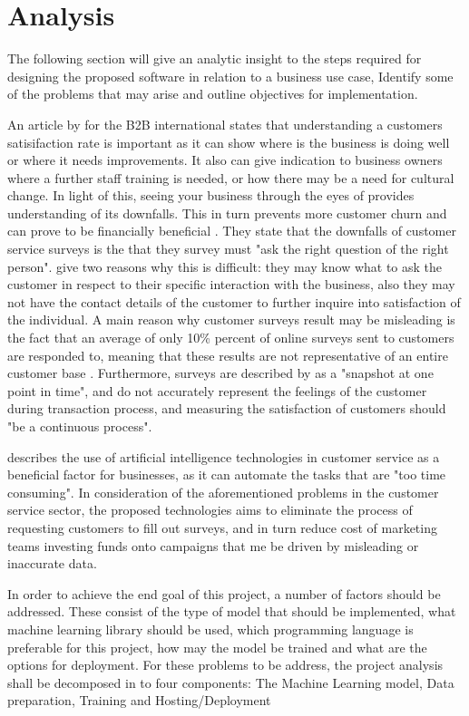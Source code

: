 \chapter{Analysis }

The following section will give an analytic insight to the steps required for designing the proposed software in relation to a business use case, Identify some of the problems that may arise and outline objectives for implementation.

An article by \citeauthor{hague} for the B2B international states that understanding a customers satisifaction rate is important as it can show where is the business is doing well or where it needs improvements. It also can give indication to business owners where a further staff training is needed, or how there may be a need for cultural change. In light of this, seeing your business through the eyes of provides understanding of its downfalls. This in turn prevents more customer churn and can prove to be financially beneficial \citep{hague}. They state that the downfalls of customer service surveys is the that they survey must "ask the right question of the right person". \citeauthor{hague} give two reasons why this is difficult: they may know what to ask the customer in respect to their specific interaction with the business, also they may not have the contact details of the customer to further inquire into satisfaction of the individual. A main reason why customer surveys result may be misleading is the fact that an average of only 10\% percent of online surveys sent to customers are responded to, meaning that these results are not representative of an entire customer base \citep{willott} . Furthermore, surveys are described by \citeauthor{hague} as a "snapshot at one point in time", and do not accurately represent the feelings of the customer during transaction process, and measuring the satisfaction of customers should "be a continuous process".


\citeauthor{keith} describes the use of artificial intelligence technologies in customer service as a beneficial factor for businesses, as it can automate the tasks that are "too time consuming".
In consideration of the aforementioned problems in the customer service sector, the proposed technologies aims to eliminate the process of requesting customers to fill out surveys, and in turn reduce cost of marketing teams investing funds onto campaigns that me be driven by misleading or inaccurate data.

In order to achieve the end goal of this project, a number of factors should be addressed. These consist of the type of model that should be implemented, what machine learning library should be used, which programming language is preferable for this project, how may the model be trained and what are the options for deployment. For these problems to be address, the project analysis shall be decomposed in to four components: The Machine Learning model, Data preparation, Training and Hosting/Deployment


